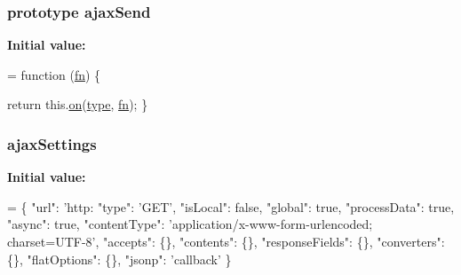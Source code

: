\subsubsection[{\texorpdfstring{ajax\+Send}{ajaxSend}}]{ {\bf prototype} ajax\+Send}\hypertarget{jquery-2_82_81-vsdoc_8js_a558f714e59e1575482b9dce5b917a905}{}\label{jquery-2_82_81-vsdoc_8js_a558f714e59e1575482b9dce5b917a905}
{\bfseries Initial value\+:}
\begin{DoxyCode}
= \textcolor{keyword}{function} (\hyperlink{jquery-2_82_81-vsdoc_8js_acef6bdaf6b9b20fdcca1ea86f0902c3b}{fn}) \{
        

        \textcolor{keywordflow}{return} this.\hyperlink{jquery-2_82_81-vsdoc_8js_ae453b412b883f60220d73468ef6c6dbc}{on}(\hyperlink{jquery-2_82_81-vsdoc_8js_a3940565e83a9bfd10d95ffd27536da91}{type}, \hyperlink{jquery-2_82_81-vsdoc_8js_acef6bdaf6b9b20fdcca1ea86f0902c3b}{fn});
    \}
\end{DoxyCode}
\subsubsection[{\texorpdfstring{ajax\+Settings}{ajaxSettings}}]{ ajax\+Settings}\hypertarget{jquery-2_82_81-vsdoc_8js_adcbb4ce9148aaf3a9a165b2ac462163b}{}\label{jquery-2_82_81-vsdoc_8js_adcbb4ce9148aaf3a9a165b2ac462163b}
{\bfseries Initial value\+:}
\begin{DoxyCode}
= \{
        \textcolor{stringliteral}{"url"}: \textcolor{stringliteral}{'http:}
\textcolor{stringliteral}{        "type": '}GET\textcolor{stringliteral}{',}
\textcolor{stringliteral}{        "isLocal": false,}
\textcolor{stringliteral}{        "global": true,}
\textcolor{stringliteral}{        "processData": true,}
\textcolor{stringliteral}{        "async": true,}
\textcolor{stringliteral}{        "contentType": '}application/x-www-form-urlencoded; charset=UTF-8\textcolor{stringliteral}{',}
\textcolor{stringliteral}{        "accepts": \{\},}
\textcolor{stringliteral}{        "contents": \{\},}
\textcolor{stringliteral}{        "responseFields": \{\},}
\textcolor{stringliteral}{        "converters": \{\},}
\textcolor{stringliteral}{        "flatOptions": \{\},}
\textcolor{stringliteral}{        "jsonp": '}callback\textcolor{stringliteral}{'}
\textcolor{stringliteral}{    \}}
\end{DoxyCode}
